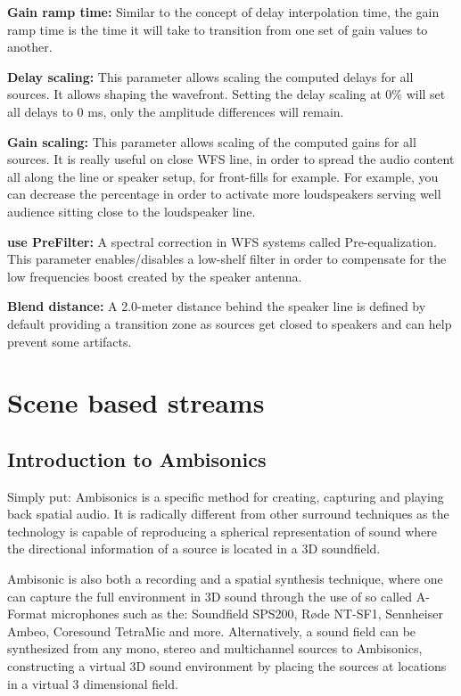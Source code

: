 \documentclass[
  letterpaper,
  DIV=11,
  numbers=noendperiod]{scrreport}
\begin{document}
\textbf{Gain ramp time:} Similar to the concept of delay interpolation
time, the gain ramp time is the time it will take to transition from one
set of gain values to another.

\textbf{Delay scaling:} This parameter allows scaling the computed
delays for all sources. It allows shaping the wavefront. Setting the
delay scaling at 0\% will set all delays to 0 ms, only the amplitude
differences will remain.

\textbf{Gain scaling:} This parameter allows scaling of the computed
gains for all sources. It is really useful on close WFS line, in order
to spread the audio content all along the line or speaker setup, for
front-fills for example. For example, you can decrease the percentage in
order to activate more loudspeakers serving well audience sitting close
to the loudspeaker line.

\textbf{use PreFilter:} A spectral correction in WFS systems called
Pre-equalization. This parameter enables/disables a low-shelf filter in
order to compensate for the low frequencies boost created by the speaker
antenna.

\textbf{Blend distance:} A 2.0-meter distance behind the speaker line is
defined by default providing a transition zone as sources get closed to
speakers and can help prevent some artifacts.

\hypertarget{scene-based-streams}{%
\chapter{Scene based streams}\label{scene-based-streams}}

\hypertarget{sec-scenebased-introAmbi}{%
\section{Introduction to Ambisonics}\label{sec-scenebased-introAmbi}}

Simply put: Ambisonics is a specific method for creating, capturing and
playing back spatial audio. It is radically different from other
surround techniques as the technology is capable of reproducing a
spherical representation of sound where the directional information of a
source is located in a 3D soundfield.

Ambisonic is also both a recording and a spatial synthesis technique,
where one can capture the full environment in 3D sound through the use
of so called A-Format microphones such as the: Soundfield SPS200, Røde
NT-SF1, Sennheiser Ambeo, Coresound TetraMic and more. Alternatively, a
sound field can be synthesized from any mono, stereo and multichannel
sources to Ambisonics, constructing a virtual 3D sound environment by
placing the sources at locations in a virtual 3 dimensional field.
\end{document}
